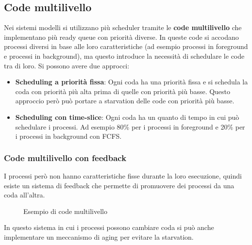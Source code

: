 \documentclass[a4paper]{article}
\begin{document}
\subsection{Code multilivello}
Nei sistemi modelli si utilizzano più scheduler tramite le \textbf{code multilivello}
che implementano più ready queue con priorità diverse. In queste code si accodano processi
diversi in base alle loro caratteristiche (ad esempio processi in foreground e processi in
background), ma questo introduce la necessità di schedulare le code tra di loro. Si
possono avere due approcci:
\begin{itemize}
  \item \textbf{Scheduling a priorità fissa}: Ogni coda ha una priorità fissa e si
    schedula la coda con priorità più alta prima di quelle con priorità più basse.
    Questo approccio però può portare a starvation delle code con priorità più basse.

  \item \textbf{Scheduling con time-slice}: Ogni coda ha un quanto di tempo in cui
    può schedulare i processi. Ad esempio 80\% per i processi in foreground e 20\%
    per i processi in background con FCFS.
\end{itemize}

\subsubsection{Code multilivello con feedback}
I processi però non hanno caratteristiche fisse durante la loro esecuzione, quindi
esiste un sistema di feedback che permette di promuovere dei processi da una coda
all'altra.
\begin{figure}[H]
  \centering
  \caption{Esempio di code multilivello}
\end{figure}
\noindent
In questo sistema in cui i processi possono cambiare coda si può anche implementare un
meccanismo di aging per evitare la starvation.
\end{document}
